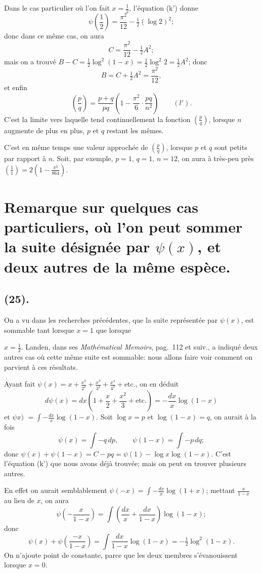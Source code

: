 \documentclass{article}
\begin{document}
Dans le cas particulier où l'on fait $x=\frac{1}{2}$, l'équation (k') donne
\[ \psi\left(\frac{1}{2}\right)=\frac{\pi^{2}}{12}-\tfrac{1}{2}(\log 2)^{2}; \]
donc dans ce même cas, on aura
\[ C=\frac{\pi^{2}}{12}-\tfrac{1}{2}A^{2}; \]
mais on a trouvé $B-C=\frac{1}{2}\log^{2}(1-x)=\frac{1}{2}\log^{2}2=\frac{1}{2}A^{2}$; donc
\[ B=C+\tfrac{1}{2}A^{2}=\frac{\pi^{2}}{12}, \]
et enfin
\[ \left(\frac{p}{q}\right)=\frac{p+q}{pq}\left(1-\frac{\pi^{2}}{6}\cdot\frac{pq}{n^{2}}\right)\qquad(l'). \]
C'est la limite vers laquelle tend continuellement la fonction $\left(\frac{p}{q}\right)$, lorsque $n$ augmente de plus en plus, $p$ et $q$ restant les mêmes.

C'est en même temps une valeur approchée de $\left(\frac{p}{q}\right)$, lorsque $p$ et $q$ sont petits par rapport à $n$. Soit, par exemple, $p=1$, $q=1$, $n=12$, on aura à très-peu près $\left(\frac{1}{1}\right)=2\left(1-\frac{\pi^{2}}{864}\right)$.

\section*{Remarque sur quelques cas particuliers, où l'on peut sommer la suite désignée par $\psi(x)$, et deux autres de la même espèce.}

\subsection*{(25).}

On a vu dans les recherches précédentes, que la suite représentée par $\psi(x)$, est sommable tant lorsque $x=1$ que lorsque

$x=\frac{1}{2}$. Landen, dans ses \emph{Mathématical Memoirs}, pag.~112 et suiv., a indiqué deux autres cas où cette même suite est sommable: nous allons faire voir comment on parvient à ces résultats.

Ayant fait $\psi(x)=x+\frac{x^{2}}{2^{2}}+\frac{x^{3}}{3^{2}}+\frac{x^{4}}{4^{2}}+\text{etc.}$, on en déduit
\[ d\psi(x)=dx\left(1+\frac{x}{2}+\frac{x^{2}}{3}+\text{etc.}\right)=-\frac{dx}{x}\log(1-x) \]
et $\psi x)$ $=\displaystyle\int-\frac{dx}{x}\log(1-x)$. Soit $\log x=p$ et $\log(1-x)=q$, on aurait à la fois
\[ \psi(x)=\int-q\,dp,\qquad\psi(1-x)=\int-p\,dq; \]
donc $\psi(x)+\psi(1-x)=C-pq=\psi(1)-\log x\log(1-x)$.
C'est l'équation (k') que nous avons déjà trouvée; mais on peut en trouver plusieurs autres.

En effet on aurait semblablement $\psi(-x)=\displaystyle\int-\frac{dx}{x}\log(1+x)$; mettant $\frac{x}{1-x}$ au lieu de $x$, on aura
\[ \psi\left(-\frac{x}{1-x}\right)=\int\left(\frac{dx}{x}+\frac{dx}{1-x}\right)\log(1-x); \]
donc
\[ \psi(x)+\psi\left(\frac{-x}{1-x}\right)=\int\frac{dx}{1-x}\log(1-x)=-\tfrac{1}{2}\log^{2}(1-x). \]
On n'ajoute point de constante, parce que les deux membres s'évanouissent lorsque $x=0$.
\end{document}

